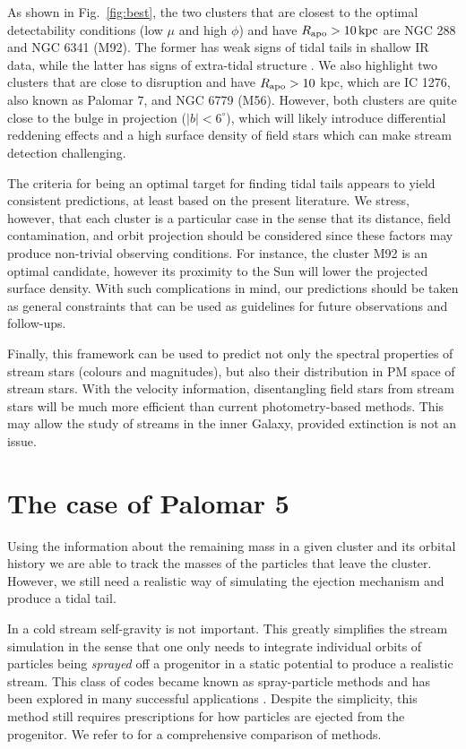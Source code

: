 \documentclass[useAMS,usenatbib,fleqn]{mnras}
\newcommand{\kpc}{{\rm kpc}}
\newcommand{\rapo}{R_{\rm apo}}
\begin{document}
As shown in Fig.~\ref{fig:best}, the two clusters that are closest to the
optimal detectability conditions (low $\mu$ and high $\phi$) and have
$\rapo>10\,\kpc$ are NGC 288 and NGC 6341 (M92). The former has weak signs of
tidal tails \citep{Grillmair04} in shallow IR data, while the latter has signs
of extra-tidal structure \citep{Lee03}.  We also highlight two clusters that are
close to disruption and have $\rapo > 10$ kpc, which are IC 1276, also known as
Palomar 7, and NGC 6779 (M56).  However, both clusters are quite close to the
bulge in projection ($|b| < 6^{\circ}$), which will likely introduce
differential reddening effects and a high surface density of field stars which
can make stream detection challenging.

The criteria for being an optimal target for finding tidal tails appears to
yield consistent predictions, at least based on the present literature. We
stress, however, that each cluster is a particular case in the sense that its
distance, field contamination, and orbit projection should be considered since
these factors may produce non-trivial observing conditions. For instance, the
cluster M92 is an optimal candidate, however its proximity to the Sun will lower
the projected surface density. With such complications in mind, our predictions
should be taken as general constraints that can be used as guidelines for future
observations and follow-ups.

Finally, this framework can be used to predict not only the spectral properties
of stream stars (colours and magnitudes), but also their distribution in PM
space of stream stars. With the velocity information, disentangling field stars
from stream stars will be much more efficient than current photometry-based
methods. This may allow the study of streams in the inner Galaxy, provided
extinction is not an issue.

\section{The case of Palomar 5}

Using the information about the remaining mass in a given cluster and its
orbital history we are able to track the masses of the particles that leave the
cluster. However, we still need a realistic way of simulating the ejection
mechanism and produce a tidal tail.

In a cold stream self-gravity is not important.  This  greatly simplifies the
stream simulation in the sense that one only needs to integrate individual
orbits of particles being \emph{sprayed} off a progenitor in a static potential
to produce a realistic stream. This class of codes became known as 
spray-particle methods and has been explored in many successful applications
\citep{Kuepper12, Fardal15, Sesar15, Erkal16, Amorisco15, Bonaca14}. Despite the
simplicity, this method still requires prescriptions for how particles are
ejected from the progenitor. We refer to \citet{Fardal15} for a comprehensive
comparison of methods.
\end{document}
